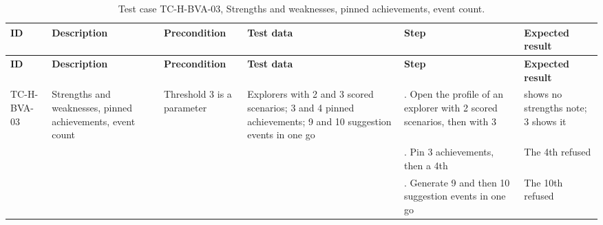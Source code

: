 {\footnotesize{}\renewcommand{\arraystretch}{1.1}
\begin{longtable}{|>{\raggedright\arraybackslash}p{}|>{\raggedright\arraybackslash}p{}|>{\raggedright\arraybackslash}p{}|>{\raggedright\arraybackslash}p{}|>{\raggedright\arraybackslash}p{}|>{\raggedright\arraybackslash}p{}|}
\caption{Test case TC-\allowbreak{}H-\allowbreak{}BVA-\allowbreak{}03, Strengths and weaknesses, pinned achievements, event count.} \\
\hline
\textbf{ID} & \textbf{Description} & \textbf{Precondition} & \textbf{Test data} & \textbf{Step} & \textbf{Expected result} \\ \hline
\endfirsthead
\hline
\textbf{ID} & \textbf{Description} & \textbf{Precondition} & \textbf{Test data} & \textbf{Step} & \textbf{Expected result} \\ \hline
\endhead
TC-H-BVA-03 & Strengths and weaknesses, pinned achievements, event count & Threshold 3 is a parameter & Explorers with 2 and 3 scored scenarios; 3 and 4 pinned achievements; 9 and 10 suggestion events in one go & 1. Open the profile of an explorer with 2 scored scenarios, then with 3 & 2 shows no strengths note; 3 shows it \\ \cline{5-6}
 &  &  &  & 2. Pin 3 achievements, then a 4th & The 4th refused \\ \cline{5-6}
 &  &  &  & 3. Generate 9 and then 10 suggestion events in one go & The 10th refused \\ \hline
\end{longtable}
}


